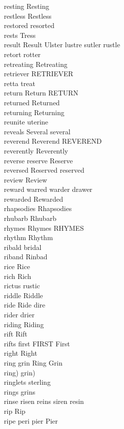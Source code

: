 resting Resting\\
restless Restless\\
restored resorted\\
rests Tress\\
result Result Ulster lustre sutler rustle\\
retort rotter\\
retreating Retreating\\
retriever RETRIEVER\\
retta treat\\
return Return RETURN\\
returned Returned\\
returning Returning\\
reunite uterine\\
reveals Several several\\
reverend Reverend REVEREND\\
reverently Reverently\\
reverse reserve Reserve\\
reversed Reserved reserved\\
review Review\\
reward warred warder drawer\\
rewarded Rewarded\\
rhapsodies Rhapsodies\\
rhubarb Rhubarb\\
rhymes Rhymes RHYMES\\
rhythm Rhythm\\
ribald bridal\\
riband Rinbad\\
rice Rice\\
rich Rich\\
rictus rustic\\
riddle Riddle\\
ride Ride dire\\
rider drier\\
riding Riding\\
rift Rift\\
rifts first FIRST First\\
right Right\\
ring grin Ring Grin\\
ring) grin)\\
ringlets sterling\\
rings grins\\
rinse risen reins siren resin\\
rip Rip\\
ripe peri pier Pier\\
